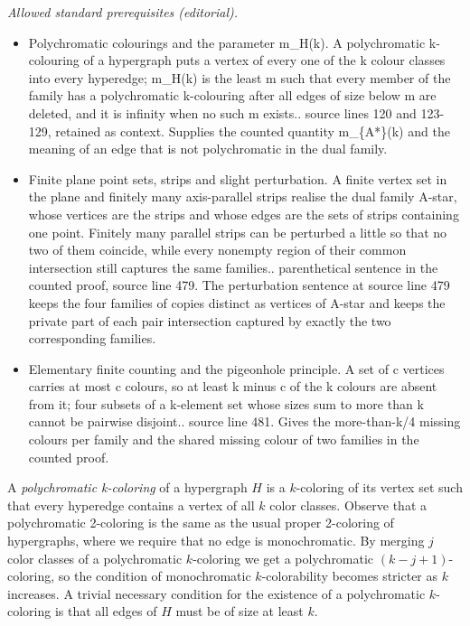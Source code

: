 \documentclass[10pt,a4paper]{amsart}
\begin{document}
\noindent\textit{Allowed standard prerequisites (editorial).}\begin{itemize}
\item Polychromatic colourings and the parameter m\_H(k). A polychromatic k-colouring of a hypergraph puts a vertex of every one of the k colour classes into every hyperedge; m\_H(k) is the least m such that every member of the family has a polychromatic k-colouring after all edges of size below m are deleted, and it is infinity when no such m exists.. source lines 120 and 123-129, retained as context. Supplies the counted quantity m\_\{A*\}(k) and the meaning of an edge that is not polychromatic in the dual family.
\item Finite plane point sets, strips and slight perturbation. A finite vertex set in the plane and finitely many axis-parallel strips realise the dual family A-star, whose vertices are the strips and whose edges are the sets of strips containing one point. Finitely many parallel strips can be perturbed a little so that no two of them coincide, while every nonempty region of their common intersection still captures the same families.. parenthetical sentence in the counted proof, source line 479. The perturbation sentence at source line 479 keeps the four families of copies distinct as vertices of A-star and keeps the private part of each pair intersection captured by exactly the two corresponding families.
\item Elementary finite counting and the pigeonhole principle. A set of c vertices carries at most c colours, so at least k minus c of the k colours are absent from it; four subsets of a k-element set whose sizes sum to more than k cannot be pairwise disjoint.. source line 481. Gives the more-than-k/4 missing colours per family and the shared missing colour of two families in the counted proof.
\end{itemize}\medskip
A {\it polychromatic k-coloring} of a hypergraph $H$ is a $k$-coloring of its vertex set such that every hyperedge contains a vertex of all $k$ color classes. Observe that a polychromatic 2-coloring is the same as the usual proper 2-coloring of hypergraphs, where we require that no edge is monochromatic. By merging $j$ color classes of a polychromatic $k$-coloring we get a polychromatic $(k-j+1)$-coloring, so the condition of monochromatic $k$-colorability becomes stricter as $k$ increases. A trivial necessary condition for the existence of a polychromatic $k$-coloring is that all edges of $H$ must be of size at least $k$.
\end{document}
